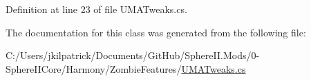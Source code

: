 Definition at line 23 of file U\+M\+A\+Tweaks.\+cs.



The documentation for this class was generated from the following file\+:\begin{DoxyCompactItemize}
\item 
C\+:/\+Users/jkilpatrick/\+Documents/\+Git\+Hub/\+Sphere\+I\+I.\+Mods/0-\/\+Sphere\+I\+I\+Core/\+Harmony/\+Zombie\+Features/\mbox{\hyperlink{_u_m_a_tweaks_8cs}{U\+M\+A\+Tweaks.\+cs}}\end{DoxyCompactItemize}
